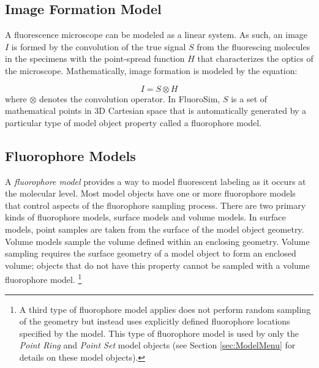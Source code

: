 \documentclass[11pt,titlepage,twoside]{article}
\begin{document}
\subsection{Image Formation Model}

A fluorescence microscope can be modeled as a linear system. As such, an image $I$ is formed by the convolution of the true signal $S$ from the fluorescing molecules in the specimens with the point-spread function $H$ that characterizes the optics of the microscope. Mathematically, image formation is modeled by the equation:

\begin{equation}
I = S \otimes H
\end{equation}
where $\otimes$ denotes the convolution operator. In FluoroSim, $S$ is a set of mathematical points in 3D Cartesian space that is automatically generated by a particular type of model object property called a fluorophore model.

\subsection{Fluorophore Models}
\label{sec:FluorophoreModels}

A \emph{fluorophore model} provides a way to model fluorescent labeling as it occurs at the molecular level. Most model objects have one or more fluorophore models that control aspects of the fluorophore sampling process. There are two primary kinds of fluorophore models, surface models and volume models. In surface models, point samples are taken from the surface of the model object geometry. Volume models sample the volume defined within an enclosing geometry. Volume sampling requires the surface geometry of a model object to form an enclosed volume; objects that do not have this property cannot be sampled with a volume fluorophore model. \footnote{A third type of fluorophore model applies does not perform random sampling of the geometry but instead uses explicitly defined fluorophore locations specified by the model. This type of fluorophore model is used by only the \emph{Point Ring} and \emph{Point Set} model objects (see Section \ref{sec:ModelMenu} for details on these model objects).}
\end{document}
